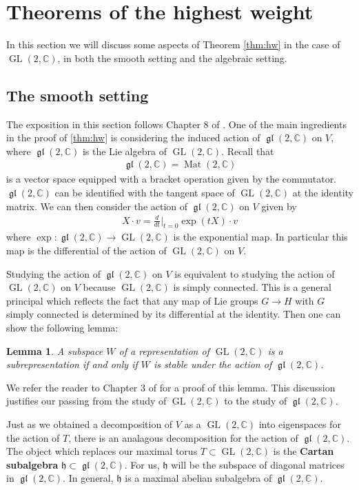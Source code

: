\documentclass[manuscript, printscheme]{aomart}
\theoremstyle{plain} %
\newtheorem{lemma}[equation]{Lemma}
\theoremstyle{definition}
\theoremstyle{remark}
\DeclareMathOperator{\Mat}{Mat}
\DeclareMathOperator{\GL}{GL}
\newcommand{\C}{\mathbb{C}}
\newcommand{\mf}[1]{\mathfrak{#1}}
\DeclareMathOperator{\gl}{\mf{gl}}
\begin{document}
\section{Theorems of the highest weight}
In this section we will discuss some aspects of Theorem \ref{thm:hw} in the case of $\GL(2,\C)$,
in both the smooth setting and the algebraic setting.

\subsection{The smooth setting}
The exposition in this section follows Chapter 8 of \cite{fulton}.
One of the main ingredients in the proof of \ref{thm:hw} is considering the induced action of $\gl(2,\C)$ on $V$,
where $\gl(2,\C)$ is the Lie algebra of $\GL(2,\C)$. Recall that \begin{align*}
	\gl(2,\C) = \Mat(2,\C)
\end{align*} is a vector space equipped with a bracket operation given by the commutator. $\gl(2,\C)$
can be identified with the tangent space of $\GL(2,\C)$ at the identity matrix. We can then consider the action of $\gl(2,\C)$ on $V$ given by \begin{align*}
	X\cdot v = \frac{d}{dt}\bigg\vert_{t=0} \exp(tX)\cdot v
\end{align*} where $\exp: \gl(2,\C)\to \GL(2,\C)$ is the exponential map. In particular this map is the differential of the action of $\GL(2,\C)$ on $V$.

\hfill

Studying the action of $\gl(2,\C)$ on $V$ is equivalent to studying the action of $\GL(2,\C)$ on $V$ because $\GL(2,\C)$ is simply
connected. This is a general principal which reflects the fact that any map of Lie groups $G\to H$
with $G$ simply connected is determined by its differential at the identity. Then one can show the following lemma:
\begin{lemma}\label{lemma:liealg}
	A subspace $W$ of a representation of $\GL(2,\C)$ is a subrepresentation if and only if $W$ is stable under the action of $\gl(2,\C)$.
\end{lemma}
We refer the reader to Chapter 3 of \cite{bourbaki} for a proof of this lemma.
This discussion justifies our passing from the study of $\GL(2,\C)$ to the study of $\gl(2,\C)$.

\hfill

Just as we obtained a decomposition of $V$ as a $\GL(2,\C)$ into eigenspaces for the action of $T$,
there is an analagous decomposition for the action of $\gl(2,\C)$.
The object which replaces our maximal torus $T\subset\GL(2,\C)$ is the \textbf{Cartan subalgebra} $\mf h\subset \gl(2,\C)$.
For us, $\mf h$ will be the subspace of diagonal matrices in $\gl(2,\C)$. In general, $\mf h$ is a maximal abelian subalgebra of $\gl(2,\C)$.
\end{document}
